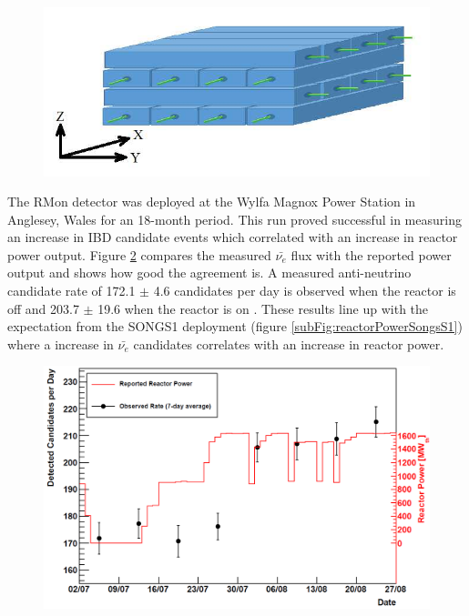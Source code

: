\begin{figure}[!h]
\centering
  \centering
  \includegraphics[width=0.6\linewidth]{Chapter2/Figs/Raster/VIDARR_diagram.jpeg}
  \label{fig:vidarrDiagram}
\end{figure}

The RMon detector was deployed at the Wylfa Magnox Power Station in Anglesey, Wales for an 18-month period. This run proved successful in measuring an increase in IBD candidate events which correlated with an increase in reactor power output. Figure \ref{fig:prototypeMeasumentFlux} compares the measured $\bar{\nu_e}$ flux with the reported power output and shows how good the agreement is. A measured anti-neutrino candidate rate of 172.1 $\pm$ 4.6 candidates per day is observed when the reactor is off and 203.7 $\pm$ 19.6 when the reactor is on \cite{Carroll_2018}. These results line up with the expectation from the SONGS1 deployment (figure \ref{subFig:reactorPowerSongsS1}) where a increase in $\bar{\nu_e}$ candidates correlates with an increase in reactor power. %
\begin{figure}[!h]
 \centering
 \includegraphics[width=0.7\linewidth]{Chapter2/Figs/Raster/prototypeMeasureOnFig.png} 
 \label{fig:prototypeMeasumentFlux}
\end{figure}

